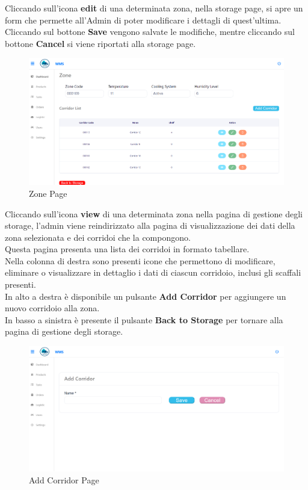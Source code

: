 Cliccando sull'icona \textbf{edit} di una determinata zona, nella storage page, si apre un form
che permette all'Admin di poter modificare i dettagli di quest'ultima.\\
Cliccando sul bottone \textbf{Save} vengono salvate le modifiche, mentre cliccando sul bottone \textbf{Cancel} si viene
riportati alla storage page.

\begin{figure}[H]
    \centering
    \includegraphics[width=\textwidth]{document/sections/img/Storyboard/viewZone.png}
    \caption{Zone Page}
    \label{fig:zonePage}
\end{figure}

Cliccando sull'icona \textbf{view} di una determinata zona nella pagina di gestione degli storage, l’admin viene reindirizzato alla pagina di visualizzazione dei dati della zona selezionata e dei corridoi che la compongono.\\
Questa pagina presenta una lista dei corridoi in formato tabellare.\\
Nella colonna di destra sono presenti icone che permettono di modificare, eliminare o visualizzare in dettaglio i dati di ciascun corridoio, inclusi gli scaffali presenti.\\
In alto a destra è disponibile un pulsante \textbf{Add Corridor} per aggiungere un nuovo corridoio alla zona.\\
In basso a sinistra è presente il pulsante \textbf{Back to Storage} per tornare alla pagina di gestione degli storage.

\begin{figure}[H]
    \centering
    \includegraphics[width=\textwidth]{document/sections/img/Storyboard/addCorridorPage.png}
    \caption{Add Corridor Page}
    \label{fig:addCorridorPages}
\end{figure}


